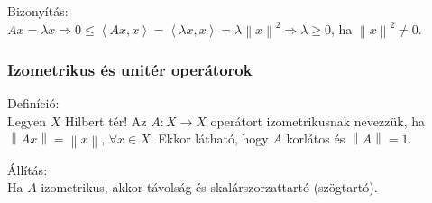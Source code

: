 \documentclass[12pt,a4paper]{scrartcl}
\newenvironment{definicio}{}{}
\newenvironment{bizonyitas}{}{}
\newenvironment{allitas}{}{}
\begin{document}
\begin{bizonyitas}

Bizonyítás:\\
\(\left. Ax = \lambda x\Rightarrow 0 \leq \left\langle {Ax,x} \right\rangle = \left\langle {\lambda x,x} \right\rangle = \lambda\left\| x \right\|^{2}\Rightarrow\lambda \geq 0 \right.\),
ha \(\left\| x \right\|^{2} \neq 0\).

\end{bizonyitas}

\hypertarget{izometrikus-es-uniter-operatorok}{%
\subsubsection{Izometrikus és unitér
operátorok}\label{izometrikus-es-uniter-operatorok}}

\begin{definicio}

Definíció:\\
Legyen \(X\) Hilbert tér! Az \(\left. A:X\rightarrow X \right.\)
operátort izometrikusnak nevezzük, ha
\(\left\| {Ax} \right\| = \left\| x \right\|\), \(\forall x \in X\).
Ekkor látható, hogy \(A\) korlátos és \(\left\| A \right\| = 1\).

\end{definicio}

\begin{allitas}

Állítás:\\
Ha \(A\) izometrikus, akkor távolság és skalárszorzattartó (szögtartó).

\end{allitas}
\end{document}
